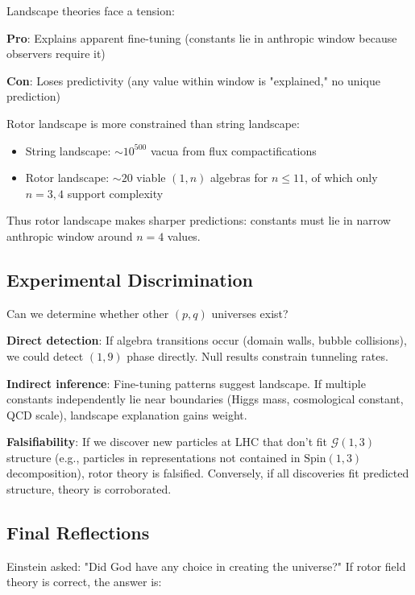 \documentclass[11pt,a4paper]{article}
\numberwithin{equation}{section}
\theoremstyle{plain}
\theoremstyle{definition}
\theoremstyle{remark}
\newcommand{\Cl}{\mathcal{G}}               %
\newcommand{\Spin}{\mathrm{Spin}}
\begin{document}
Landscape theories face a tension:

\textbf{Pro}: Explains apparent fine-tuning (constants lie in anthropic window because observers require it)

\textbf{Con}: Loses predictivity (any value within window is "explained," no unique prediction)

Rotor landscape is more constrained than string landscape:
\begin{itemize}
\item String landscape: $\sim 10^{500}$ vacua from flux compactifications
\item Rotor landscape: $\sim 20$ viable $(1,n)$ algebras for $n \leq 11$, of which only $n=3,4$ support complexity
\end{itemize}

Thus rotor landscape makes sharper predictions: constants must lie in narrow anthropic window around $n=4$ values.

\subsection{Experimental Discrimination}

Can we determine whether other $(p,q)$ universes exist?

\textbf{Direct detection}: If algebra transitions occur (domain walls, bubble collisions), we could detect $(1,9)$ phase directly. Null results constrain tunneling rates.

\textbf{Indirect inference}: Fine-tuning patterns suggest landscape. If multiple constants independently lie near boundaries (Higgs mass, cosmological constant, QCD scale), landscape explanation gains weight.

\textbf{Falsifiability}: If we discover new particles at LHC that don't fit $\Cl(1,3)$ structure (e.g., particles in representations not contained in $\Spin(1,3)$ decomposition), rotor theory is falsified. Conversely, if all discoveries fit predicted structure, theory is corroborated.

\subsection{Final Reflections}

Einstein asked: "Did God have any choice in creating the universe?" If rotor field theory is correct, the answer is:

\begin{center}
\end{center}
\end{document}

